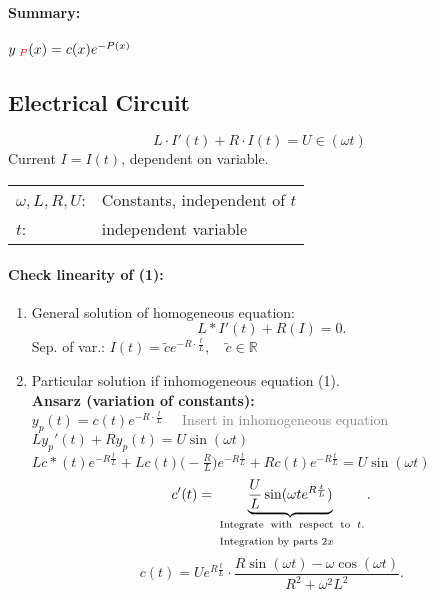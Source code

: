 \documentclass[]{article}
\begin{document}
\paragraph{Summary:} $y_ \text{ \textcolor{red}{$P$}}(x)=c(x) e ^{-P(x)}$
\subsection{Electrical Circuit}
\begin{equation}
L \cdot I'(t)+R \cdot I(t)=U\in(\omega t)
\end{equation}
Current $I=I(t)$, dependent on variable.\\
\begin{tabular}{@{}l l}
	$\omega,L,R,U$: & Constants, independent of $t$\\
	$t$: & independent variable
\end{tabular}
\paragraph{Check linearity of (1):} 
\begin{enumerate}
	\renewcommand{\labelenumi}{\alph{enumi})}
	\item General solution of homogeneous equation: \[
	L*I'(t)+R(I) =0
	.\] 
	Sep. of var.: $I(t)=\tilde c e ^{-R \cdot \frac{t}{L}},\quad\tilde c\in \mathbb R$
\item Particular solution if inhomogeneous equation (1).\\
	\textbf{Ansarz (variation of constants):}\\
	$y_p(t)=c(t) e ^{-R \cdot \frac{t}{L}}\quad$ \textcolor{gray}{Insert in inhomogeneous equation}\\
	$Ly_p'(t)+Ry_p(t)=U\sin(\omega t)$\\
	$Lc*(t)e ^{-R \frac{t}{L}}+Lc(t)\big(- \frac{R}{L}\big) e ^{-R \frac{t}{L}}+Rc(t) e ^{-R \frac{t}{L}}=U\sin(\omega t)$
	\[
	c'(t)= \underbrace{ \frac{U}{L}\sin (\omega t e ^{R \frac{t}{L}})}_\text{ \parbox{13em}{Integrate with respect to $t$. Integration by parts $2x$}}	.\]
	\[
	c(t)=U e ^{R \frac{t}{L}} \cdot \frac{R \sin (\omega t) -\omega \cos(\omega t)}{R ^{2}+ \omega ^{2} L ^{2}}
	.\]
\end{enumerate}
\end{document}
